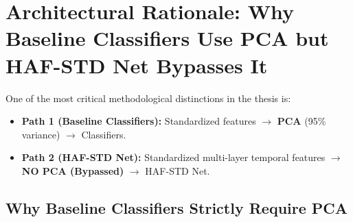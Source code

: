 \documentclass[11pt, a4paper]{article}
\begin{document}
\clearpage

\section{Architectural Rationale: Why Baseline Classifiers Use PCA but HAF-STD Net Bypasses It}

One of the most critical methodological distinctions in the thesis is:
\begin{itemize}[leftmargin=1.2em]
    \item \textbf{Path 1 (Baseline Classifiers):} Standardized features $\longrightarrow$ \textbf{PCA} (95\% variance) $\longrightarrow$ Classifiers.
    \item \textbf{Path 2 (HAF-STD Net):} Standardized multi-layer temporal features $\longrightarrow$ \textbf{NO PCA (Bypassed)} $\longrightarrow$ HAF-STD Net.
\end{itemize}

\subsection{Why Baseline Classifiers Strictly Require PCA}
\end{document}
